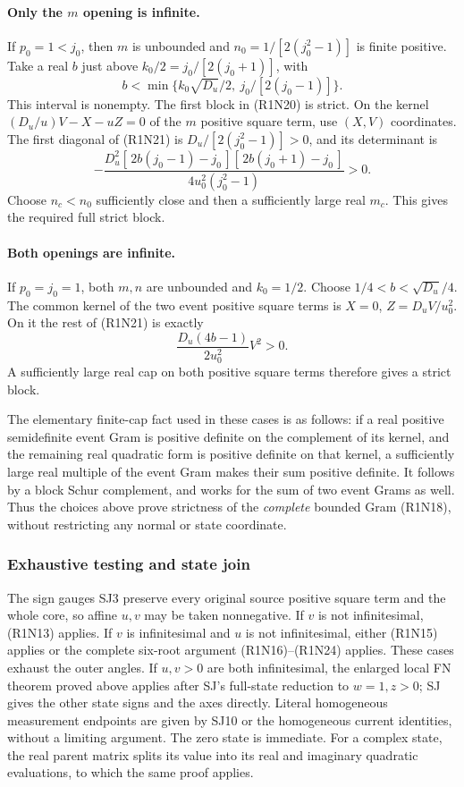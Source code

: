 \paragraph{Only the \(m\) opening is infinite.}
If $p_0=1<j_0$, then $m$ is unbounded and
$n_0=1/[2(j_0^2-1)]$ is finite positive.
Take a real $b$ just above $k_0/2=j_0/[2(j_0+1)]$, with
\[
 b<\min\{k_0\sqrt{D_u}/2,\ j_0/[2(j_0-1)]\}.
\]
This interval is nonempty.  The first block in (R1N20) is strict.
On the kernel $(D_u/u)V-X-uZ=0$ of the $m$ positive square term, use $(X,V)$
coordinates.  The first diagonal of (R1N21) is
$D_u/[2(j_0^2-1)]>0$, and its determinant is
\[
 -\frac{D_u^2[\,2b(j_0-1)-j_0\,][\,2b(j_0+1)-j_0\,]}
        {4u_0^2(j_0^2-1)}>0.                            \tag{R1N23}
\]
Choose $n_c<n_0$ sufficiently close and then a sufficiently large
real $m_c$.  This gives the required full strict block.

\paragraph{Both openings are infinite.}
If $p_0=j_0=1$, both $m,n$ are unbounded and $k_0=1/2$.
Choose
$1/4<b<\sqrt{D_u}/4$.
The common kernel of the two event positive square terms is
$X=0$, $Z=D_uV/u_0^2$.  On it the rest of (R1N21) is exactly
\[
 \frac{D_u(4b-1)}{2u_0^2}V^2>0.                        \tag{R1N24}
\]
A sufficiently large real cap on both positive square terms therefore gives
a strict block.

The elementary finite-cap fact used in these cases is as follows:
if a real positive semidefinite event Gram is positive definite on
the complement of its kernel, and the remaining real quadratic
form is positive definite on that kernel, a sufficiently large
real multiple of the event Gram makes their sum positive definite.
It follows by a block Schur complement, and works for the sum of
two event Grams as well.  Thus the choices above prove strictness
of the \emph{complete} bounded Gram (R1N18), without restricting
any normal or state coordinate.

\subsubsection*{Exhaustive testing and state join}

The sign gauges SJ3 preserve every original source positive square term and the
whole core, so affine $u,v$ may be taken nonnegative.
If $v$ is not infinitesimal, (R1N13) applies.
If $v$ is infinitesimal and $u$ is not infinitesimal, either
(R1N15) applies or the complete six-root argument
(R1N16)--(R1N24) applies.  These cases exhaust the outer angles.
If $u,v>0$ are both infinitesimal, the enlarged local FN theorem
proved above applies after SJ's full-state reduction to $w=1,z>0$;
SJ gives the other state signs and the axes directly.
Literal homogeneous measurement endpoints are given by SJ10 or
the homogeneous current identities, without a limiting argument.
The zero state is immediate.  For a complex state, the real
parent matrix splits its value into its real and imaginary
quadratic evaluations, to which the same proof applies.

